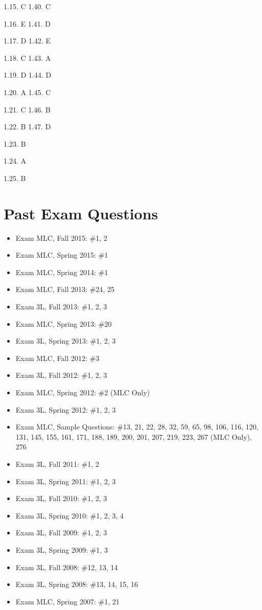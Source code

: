 \documentclass[]{book}
\begin{document}
1.15. C 1.40. C

1.16. E 1.41. D

1.17. D 1.42. E

1.18. C 1.43. A

1.19. D 1.44. D

1.20. A 1.45. C

1.21. C 1.46. B

1.22. B 1.47. D

1.23. B

1.24. A

1.25. B

\section{Past Exam Questions}\label{past-exam-questions}

\begin{itemize}
\item
  Exam MLC, Fall 2015: \#1, 2
\item
  Exam MLC, Spring 2015: \#1
\item
  Exam MLC, Spring 2014: \#1
\item
  Exam MLC, Fall 2013: \#24, 25
\item
  Exam 3L, Fall 2013: \#1, 2, 3
\item
  Exam MLC, Spring 2013: \#20
\item
  Exam 3L, Spring 2013: \#1, 2, 3
\item
  Exam MLC, Fall 2012: \#3
\item
  Exam 3L, Fall 2012: \#1, 2, 3
\item
  Exam MLC, Spring 2012: \#2 (MLC Only)
\item
  Exam 3L, Spring 2012: \#1, 2, 3
\item
  Exam MLC, Sample Questions: \#13, 21, 22, 28, 32, 59, 65, 98, 106,
  116, 120, 131, 145, 155, 161, 171, 188, 189, 200, 201, 207, 219, 223,
  267 (MLC Only), 276
\item
  Exam 3L, Fall 2011: \#1, 2
\item
  Exam 3L, Spring 2011: \#1, 2, 3
\item
  Exam 3L, Fall 2010: \#1, 2, 3
\item
  Exam 3L, Spring 2010: \#1, 2, 3, 4
\item
  Exam 3L, Fall 2009: \#1, 2, 3
\item
  Exam 3L, Spring 2009: \#1, 3
\item
  Exam 3L, Fall 2008: \#12, 13, 14
\item
  Exam 3L, Spring 2008: \#13, 14, 15, 16
\item
  Exam MLC, Spring 2007: \#1, 21
\end{itemize}
\end{document}
